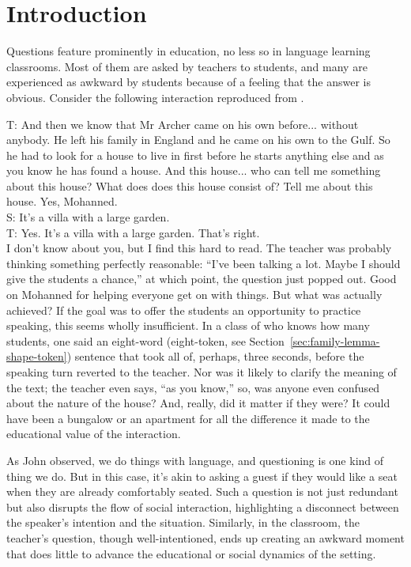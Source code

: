 \section{Introduction} 
Questions feature prominently in education, no less so in language learning classrooms. Most of them are asked by teachers to students, and many are experienced as awkward by students because of a feeling that the answer is obvious. Consider the following interaction reproduced from \citet[23]{nunn1999purposes}.

\ea
T: And then we know that Mr Archer came on his own before... without
anybody. He left his family in England and he came on his own to the
Gulf. So he had to look for a house to live in first before he starts
anything else and as you know he has found a house. And this
house... who can tell me something about this house?
What does does this house consist of? Tell me about this house.
Yes, Mohanned.\\
S: It's a villa with a large garden.\\
T: Yes. It's a villa with a large garden. That's right.\\
\z
I don't know about you, but I find this hard to read. The teacher was probably thinking something perfectly reasonable: \enquote{I've been talking a lot. Maybe I should give the students a chance,} at which point, the question just popped out. Good on Mohanned for helping everyone get on with things. But what was actually achieved? If the goal was to offer the students an opportunity to practice speaking, this seems wholly insufficient. In a class of who knows how many students, one said an eight-word (eight-token, see Section~\ref{sec:family-lemma-shape-token}) sentence that took all of, perhaps, three seconds, before the speaking turn reverted to the teacher. Nor was it likely to clarify the meaning of the text; the teacher even says, \enquote{as you know,} so, was anyone even confused about the nature of the house?  And, really, did it matter if they were? It could have been a bungalow or an apartment for all the difference it made to the educational value of the interaction.

As John \citet{searle1969} observed, we do things with language, and questioning is one kind of thing we do. But in this case, it's akin to asking a guest if they would like a seat when they are already comfortably seated. Such a question is not just redundant but also disrupts the flow of social interaction, highlighting a disconnect between the speaker's intention and the situation. Similarly, in the classroom, the teacher's question, though well-intentioned, ends up creating an awkward moment that does little to advance the educational or social dynamics of the setting.

